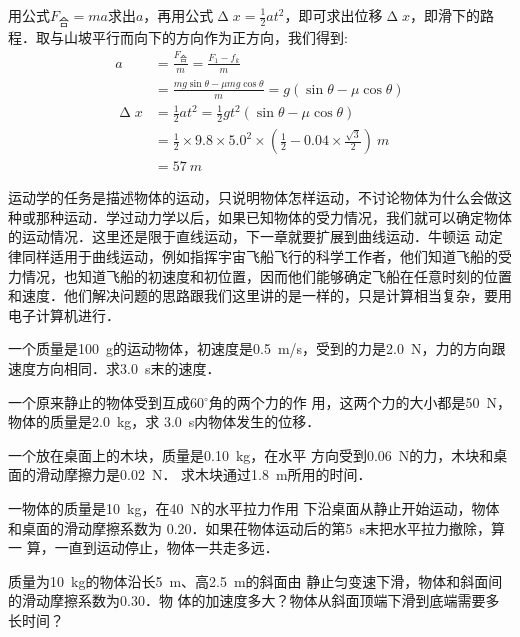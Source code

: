 \begin{Test}
\begin{Answer}
    用公式$F_{\text{合}}=ma$求出$a$，再用公式$\upDelta x=\frac{1}{2}at^2$，即可求出位移$\upDelta x$，即滑下的路程．取与山坡平行而向下的方向作为正方向，我们得到:
    \[\begin{split}
            a          & =\frac{F_{\text{合}}}{m}=\frac{F_1-f_k}{m}                                                               \\
                       & =\frac{mg\sin\theta-\mu mg\cos\theta }{m}=g(\sin\theta-\mu \cos\theta)                                  \\
            \upDelta x & =\frac{1}{2}at^2=\frac{1}{2}gt^2(\sin\theta-\mu \cos\theta)                                             \\
                       & =\frac{1}{2}\times 9.8\times 5.0^2\times \left( \frac{1}{2}-0.04\times \frac{\sqrt{3}}{2}\right)~\si{m} \\
                       & =\SI{57}{m}
        \end{split} \]
\end{Answer}

运动学的任务是描述物体的运动，只说明物体怎样运动，不讨论物体为什么会做这种或那种运动．学过动力学以后，如果已知物体的受力情况，我们就可以确定物体的运动情况．这里还是限于直线运动，下一章就要扩展到曲线运动．牛顿运
动定律同样适用于曲线运动，例如指挥宇宙飞船飞行的科学工作者，他们知道飞船的受力情况，也知道飞船的初速度和初位置，因而他们能够确定飞船在任意时刻的位置和速度．他们解决问题的思路跟我们这里讲的是一样的，只是计算相当复杂，要用电子计算机进行．




\begin{Exercise}
	\begin{QsNum}
		\item 一个质量是\SI{100}{g}的运动物体，初速度是\SI{0.5}{m/s}，受到的力是\SI{2.0}{N}，力的方向跟速度方向相同．求\SI{3.0}{s}末的速度．
		\item 一个原来静止的物体受到互成60$^\circ$角的两个力的作
		用，这两个力的大小都是\SI{50}{N}，物体的质量是\SI{2.0}{kg}，求
		\SI{3.0}{s}内物体发生的位移．
		\item 一个放在桌面上的木块，质量是\SI{0.10}{kg}，在水平
		方向受到\SI{0.06}{N}的力，木块和桌面的滑动摩擦力是\SI{0.02}{N}．
		求木块通过\SI{1.8}{m}所用的时间．
		\item 一物体的质量是\SI{10}{kg}，在\SI{40}{N}的水平拉力作用
		下沿桌面从静止开始运动，物体和桌面的滑动摩擦系数为
		0.20．如果茌物体运动后的第\SI{5}{s}末把水平拉力撤除，算一
		算，一直到运动停止，物体一共走多远．
		\item  质量为\SI{10}{kg}的物体沿长\SI{5}{m}、高\SI{2.5}{m}的斜面由
		静止匀变速下滑，物体和斜面间的滑动摩擦系数为0.30．物
		体的加速度多大？物体从斜面顶端下滑到底端需要多长时间？
	\end{QsNum}
\end{Exercise}







\end{Test}
